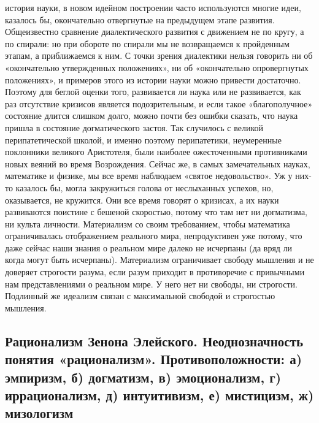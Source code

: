 история науки,  в новом  идейном построении часто  используются многие
идеи,  казалось  бы,  окончательно  отвергнутые  на  предыдущем  этапе
развития. Общеизвестно сравнение  диалектического развития с движением
не  по  кругу,  а  по  спирали:  но  при  обороте  по  спирали  мы  не
возвращаемся  к  пройденным этапам,  а  приближаемся  к ним.  С  точки
зрения  диалектики нельзя  говорить ни  об «окончательно  утвержденных
положениях», ни об «окончательно опровергнутых положениях», и примеров
этого  из  истории  науки   можно  привести  достаточно.  Поэтому  для
беглой  оценки того,  развивается  ли наука  или  не развивается,  как
раз  отсутствие   кризисов  является  подозрительным,  и   если  такое
«благополучное»  состояние  длится  слишком  долго,  можно  почти  без
ошибки сказать,  что наука  пришла в состояние  догматического застоя.
Так  случилось с  великой  перипатетической школой,  и именно  поэтому
перипатетики,   неумеренные  поклонники   великого  Аристотеля,   были
наиболее ожесточенными противниками новых веяний во время Возрождения.
Сейчас же, в  самых замечательных науках, математике и  физике, мы все
время  наблюдаем  «святое  недовольство».  Уж у  них-то  казалось  бы,
могла закружиться  голова от неслыханных успехов,  но, оказывается, не
кружится. Они  все время  говорят о кризисах,  а их  науки развиваются
поистине с  бешеной скоростью,  потому что там  нет ни  догматизма, ни
культа личности.  Материализм со  своим требованием,  чтобы математика
ограничивалась отображением реального  мира, непродуктивен уже потому,
что даже  сейчас наши знания о  реальном мире далеко не  исчерпаны (да
вряд ли когда могут  быть исчерпаны). Материализм ограничивает свободу
мышления  и  не  доверяет  строгости разума,  если  разум  приходит  в
противоречие  с  привычными нам  представлениями  о  реальном мире.  У
него  нет ни  свободы, ни  строгости. Подлинный  же идеализм  связан с
максимальной свободой и строгостью мышления.

\subsection{Рационализм  Зенона   Элейского.  Неоднозначность  понятия
«рационализм».  Противоположности:  а)   эмпиризм,  б)  догматизм,  в)
эмоционализм,  г)  иррационализм,  д) интуитивизм,  е)  мистицизм,  ж)
мизологизм}


